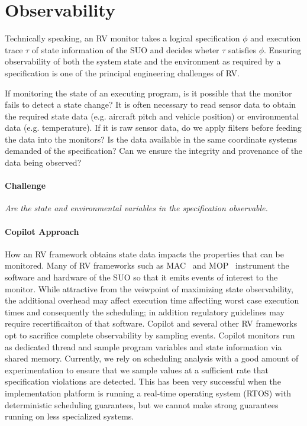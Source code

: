\section{Observability}\label{sec:observ} 

Technically speaking, an RV monitor takes a logical specification
$\phi$ and execution trace $\tau$ of state information of the SUO and
decides wheter $\tau$ satisfies $\phi$.  Ensuring observability of
both the system state and the environment as required by a
specification is one of the principal engineering challenges of RV.

If monitoring the state of an executing program, is it possible that
the monitor fails to detect a state change?  It is often necessary to
read sensor data to obtain the required state data (e.g. aircraft
pitch and vehicle position) or environmental data (e.g. temperature).
If it is raw sensor data, do we apply filters before feeding the data
into the monitors?  Is the data available in the same coordinate
systems demanded of the specification?  Can we ensure the integrity
and provenance of the data being observed?

\paragraph{Challenge} \emph{Are the state and environmental variables in the
specification  observable.}  


 
  \paragraph{Copilot Approach} 
  How an RV framework obtains state data impacts the properties that
  can be monitored.  Many of RV frameworks such as MAC~\cite{KimLKS04}
  and MOP~\cite{ChenR05} instrument the software and hardware of the
  SUO so that it emits events of interest to the monitor.  While
  attractive from the veiwpoint of maximizing state observability, the
  additional overhead may affect execution time affectiing worst case
  execution times and consequently the scheduling; in addition
  regulatory guidelines may require recertificaiton of that software.
  Copilot and several other RV
  frameworks~\cite{sampling,Kane15,borzoo} opt to sacrifice complete
  observability by sampling events.  Copilot monitors run as dedicated
  thread and sample program variables and state information via shared
  memory.  Currently, we rely on scheduling analysis with a good
  amount of experimentation to ensure that we sample values at a
  sufficient rate that specification violations are detected. This has
  been very successful when the implementation platform is running a
  real-time operating system (RTOS) with deterministic scheduling
  guarantees, but we cannot make strong guarantees running on less
  specialized systems.

